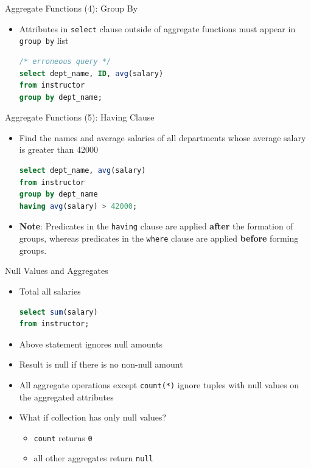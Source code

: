 \documentclass[aspectratio=169, xcolor=dvipsnames]{beamer}
\begin{document}
\begin{frame}[fragile]{Aggregate Functions (4): Group By}
    \begin{itemize}
        \item Attributes in \texttt{select} clause outside of aggregate functions must appear in \texttt{group by} list
        \begin{lstlisting}[language=SQL]
/* erroneous query */ 
select dept_name, ID, avg(salary) 
from instructor 
group by dept_name;
        \end{lstlisting}
    \end{itemize}
\end{frame}

\begin{frame}[fragile]{Aggregate Functions (5): Having Clause}
    \begin{itemize}
        \item Find the names and average salaries of all departments whose average salary is greater than 42000
        \begin{lstlisting}[language=SQL]
select dept_name, avg(salary) 
from instructor 
group by dept_name 
having avg(salary) > 42000;
        \end{lstlisting}
        \item \textbf{Note}: Predicates in the \texttt{having} clause are applied \textbf{after} the formation of groups, whereas predicates in the \texttt{where} clause are applied \textbf{before} forming groups.
    \end{itemize}
\end{frame}

\begin{frame}[fragile]{Null Values and Aggregates}
    \begin{itemize}[<+->]
        \item Total all salaries
        \begin{lstlisting}[language=SQL]
select sum(salary) 
from instructor;
        \end{lstlisting}
        \item Above statement ignores null amounts
        \item Result is null if there is no non-null amount
        \item All aggregate operations except \texttt{count(*)} ignore tuples with null values on the aggregated attributes
        \item What if collection has only null values?
        \begin{itemize}
            \item[$\triangleright$] \texttt{count} returns \texttt{0}
            \item[$\triangleright$] all other aggregates return \texttt{null}
        \end{itemize}
    \end{itemize}
\end{frame}
\end{document}

